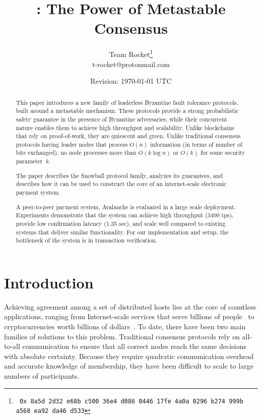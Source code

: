 \documentclass[letterpaper,twocolumn,10pt]{article}
\title{
\vspace{-0.30in}
    \Large \bf \editchange{Snowball}: The Power of Metastable Consensus}
\author{Team Rocket\footnote{\texttt{\ 0x\ 8a5d 2d32 e68b c500 36e4 d086 0446 17fe 4a0a 0296 b274 999b a568 ea92 da46 d533}
    }\\t-rocket@protonmail.com}
\date{Revision: \today{} \currenttime{} UTC}
\newcommand{\tronly}[2]{#1}
\newcommand{\editinsert}[1]{{\color{blue}#1}}
\newcommand{\editchange}[1]{{\color{orange}#1}}
\theoremstyle{definition}
\newcommand{\Jon}[1]{{\color{blue} \textbf{Jon: } #1}}
\begin{document}
\maketitle

\begin{abstract}
This paper introduces a new family of leaderless Byzantine fault tolerance protocols,
built around a metastable mechanism.
These protocols provide a strong probabilistic safety guarantee in the presence of Byzantine adversaries\tronly{, while their concurrent nature enables them to achieve high throughput and scalability.}{.}
Unlike blockchains that rely on proof-of-work, they are quiescent and green.
Unlike traditional consensus protocols having leader nodes that
process $O(n)$ information (in terms of number of bits exchanged), 
no node processes more than \editchange{$O(k\log n)$ or $O(k)$} for some security parameter~$k$.
\tronly{%

The paper describes the \editchange{Snowball protocol family}, analyzes its guarantees, and describes how it can be used to construct the core of an internet-scale electronic payment system.
}{}
\editinsert{A peer-to-peer payment system, Avalanche} is evaluated in a large scale deployment.
Experiments demonstrate that the system can achieve high throughput (3400 tps), provide low confirmation latency (1.35 sec), and scale well compared to existing systems that deliver similar functionality. For our implementation and setup, the bottleneck of the system is in transaction verification.
\end{abstract}

\section{Introduction}\tronly{}{\vspace{-0.5em}}

\tronly{Achieving agreement among a set of distributed hosts lies at the core of countless applications, ranging from Internet-scale services that serve billions of people~\cite{Burrows06,HuntKJR10} to cryptocurrencies worth billions of dollars~\cite{marketcapcryptocurrency}.}{}
To date, there have been two main families of solutions to this problem.
Traditional consensus protocols %
rely on all-to-all communication to ensure that all correct nodes reach the same decisions with absolute certainty.
Because they require quadratic communication overhead and accurate knowledge of membership, they have been difficult to scale
\tronly{to large numbers of participants.}{.}
\end{document}
